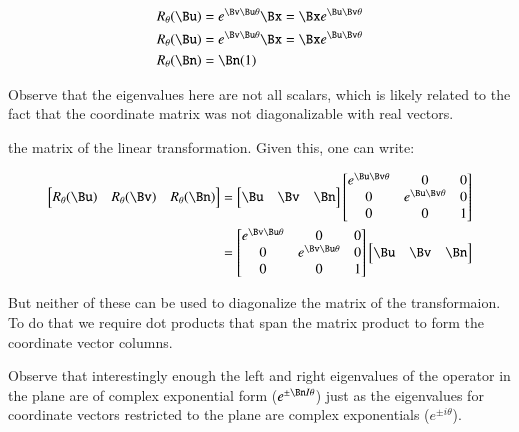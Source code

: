 \begin{align*}
R_\theta(\Bu) &= e^{\Bv \Bu \theta} \Bx = \Bx e^{\Bu \Bv \theta} \\
R_\theta(\Bu) &= e^{\Bv \Bu \theta} \Bx = \Bx e^{\Bu \Bv \theta} \\
R_\theta(\Bn) &= \Bn (1) \\
\end{align*}

Observe that the eigenvalues here are not all scalars, which is likely related
to the fact that the coordinate matrix was not diagonalizable with real vectors.

the matrix of the linear transformation.  
Given this, one can write:

\begin{align*}
\begin{bmatrix}
R_\theta(\Bu) & R_\theta(\Bv) & R_\theta(\Bn) \\
\end{bmatrix}
&=
\begin{bmatrix}
\Bu & \Bv & \Bn \\
\end{bmatrix}
\begin{bmatrix}
e^{\Bu \Bv \theta} & 0 & 0 \\
0 & e^{\Bu \Bv \theta} & 0 \\
0 & 0 & 1 \\
\end{bmatrix} \\
&=
\begin{bmatrix}
e^{\Bv \Bu \theta} & 0 & 0 \\
0 & e^{\Bv \Bu \theta} & 0 \\
0 & 0 & 1 \\
\end{bmatrix}
\begin{bmatrix}
\Bu & \Bv & \Bn \\
\end{bmatrix}
\end{align*}

But neither of these can be used to diagonalize the matrix of the transformaion.  To do that
we require dot products that span the matrix product to form the coordinate vector columns.

Observe that interestingly
enough the left and right eigenvalues of the operator in the plane are of complex exponential form ($e^{\pm \Bn I \theta}$) just as the eigenvalues for 
coordinate vectors restricted to the plane are complex exponentials ($e^{\pm i\theta}$).

